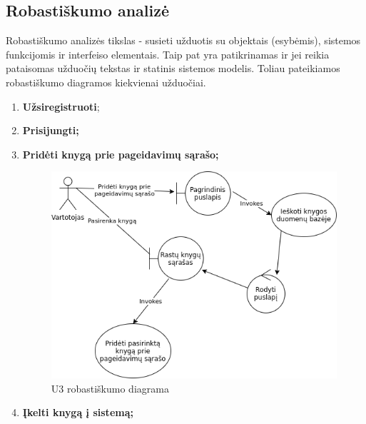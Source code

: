 \documentclass{VUMIFPSkursinis}
\begin{document}
	\subsection{Robastiškumo analizė}
		Robastiškumo analizės tikslas - susieti užduotis su objektais (esybėmis), sistemos funkcijomis ir 
		interfeiso elementais. Taip pat yra patikrinamas ir jei reikia pataisomas užduočių tekstas ir statinis sistemos modelis.
		Toliau pateikiamos robastiškumo diagramos kiekvienai užduočiai.
		\begin{enumerate}[label=\textbf{U\arabic*.}]
			\item \textbf{Užsiregistruoti};		
			\item \textbf{Prisijungti;}
			\item \textbf{Pridėti knygą prie pageidavimų sąrašo;}
				\begin{figure}[H]
					\centering
					\includegraphics[scale=0.9]{img/U3.png}
					\caption{U3 robastiškumo diagrama}
					\label{img:psi2-u3-robustness}
				\end{figure}
			\item \textbf{Įkelti knygą į sistemą;}
				\begin{figure}[H]
					\centering

\end{figure}
\end{enumerate}
\end{document}

